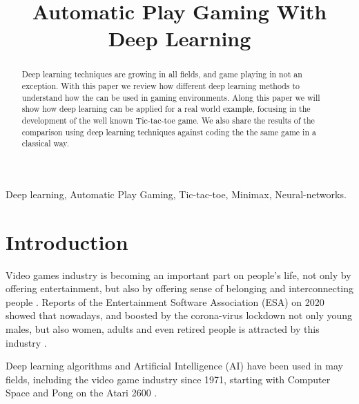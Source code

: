 \documentclass[conference]{IEEEtran}
\begin{document}
\title{Automatic Play Gaming With Deep Learning\\
}

\author{
}

\maketitle

\begin{abstract}

Deep learning techniques are growing in all fields, and game playing in not an exception. With this paper we review how different deep learning methods to understand how the can be used in gaming environments. Along this paper we will show how deep learning can be applied for a real world example, focusing in the development of the well known Tic-tac-toe game. We also share the results of the comparison using deep learning techniques against coding the the same game in a classical way.


\end{abstract}

\begin{IEEEkeywords}
Deep learning, Automatic Play Gaming, Tic-tac-toe, Minimax, Neural-networks.
\end{IEEEkeywords}

\section{Introduction}\label{sec:intro}

Video games industry is becoming an important part on people's life, not only by offering entertainment, but also by offering sense of belonging and interconnecting people \cite{niche}. Reports of the Entertainment Software Association (ESA) on 2020 showed that nowadays, and boosted by the corona-virus lockdown  not only young males, but also women, adults and even retired people is attracted by this industry \cite{niche}.

Deep learning algorithms and Artificial Intelligence (AI) have been used in may fields, including the video game industry since 1971, starting with Computer Space and Pong on the Atari 2600 \cite{atari}.
\end{document}
